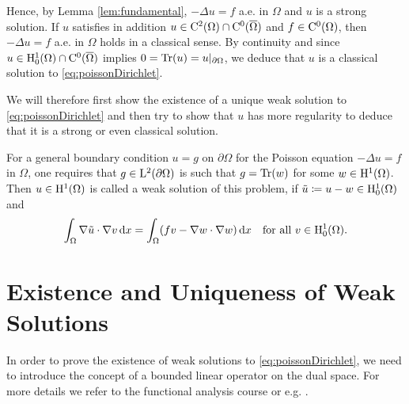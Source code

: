 Hence, by Lemma \ref{lem:fundamental}, $-\Delta u = f$ a.e. in $\Omega$ and $u$ is a strong solution. If $u$ satisfies in addition $u \in \mathrm{C}^2(\Omega) \cap \mathrm{C}^0(\overline\Omega)$ and $f \in \mathrm{C}^0(\Omega)$, then $-\Delta u = f$ a.e. in $\Omega$ holds in a classical sense. 
By continuity and since $u \in \mathrm{H}_0^1(\Omega) \cap \mathrm{C}^0(\overline\Omega)$ implies $0 = \operatorname{Tr}(u) = u|_{\partial\Omega}$, we deduce that $u$ is a classical solution to \eqref{eq:poissonDirichlet}.

We will therefore first show the existence of a unique weak solution to \eqref{eq:poissonDirichlet} and then try to show that $u$ has more regularity to deduce that it is a strong or even classical solution.

For a general boundary condition $u = g$ on $\partial\Omega$ for the Poisson equation $-\Delta u = f$ in $\Omega$, one requires that $g \in \mathrm{L}^2(\partial\Omega)$ is such that $g = \operatorname{Tr}(w)$ for some $w \in \mathrm{H}^1(\Omega)$.
Then $u \in \mathrm{H}^1(\Omega)$ is called a weak solution of this problem, if $\tilde u \coloneqq u - w \in \mathrm{H}_0^1(\Omega)$ and 
$$
\int_\Omega \nabla \tilde u \cdot \nabla v \, {\operatorname{d}\!{x}}
= \int_\Omega (f v - \nabla w \cdot \nabla w) \, {\operatorname{d}\!{x}} \quad\text{for all } v \in \mathrm{H}_0^1(\Omega).
$$

\section{Existence and Uniqueness of Weak Solutions}

In order to prove the existence of weak solutions to \eqref{eq:poissonDirichlet}, we need to introduce the concept of a bounded linear operator on the dual space.
For more details we refer to the functional analysis course or e.g. \cite[Sections 2.3, 2.4]{dobrowolski2010angewandte}.

